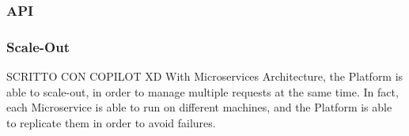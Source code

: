 \subsubsection{API}
\subsubsection{Scale-Out}
SCRITTO CON COPILOT XD
With Microservices Architecture, the Platform is able to scale-out, in order to manage multiple requests at the same time. In fact, each Microservice is able to run on different machines, and the Platform is able to replicate them in order to avoid failures.